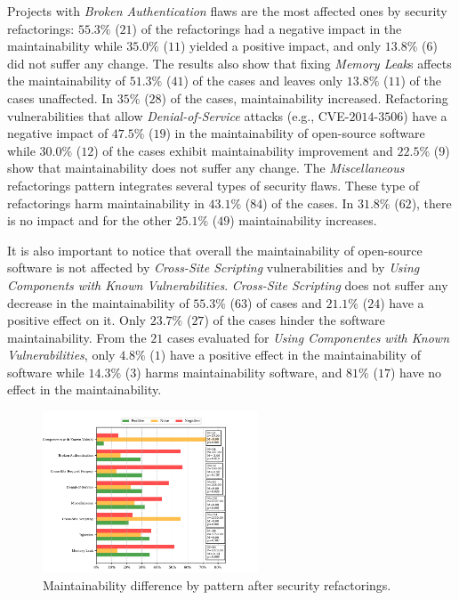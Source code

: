 \documentclass[sigconf,review]{acmart}
\begin{document}
Projects with \emph{Broken Authentication} flaws are the most affected ones by
security refactorings: $55.3\%$ ($21$) of the refactorings had a negative impact
in the maintainability while $35.0\%$ ($11$) yielded a positive impact, and only
$13.8\%$ ($6$) did not suffer any change. The results also show that fixing
\emph{Memory Leak}s affects the maintainability of $51.3\%$ ($41$) of the cases
and leaves only $13.8\%$ ($11$) of the cases unaffected. In $35\%$ ($28$) of the
cases, maintainability increased. Refactoring vulnerabilities that allow
\emph{Denial-of-Service} attacks (e.g., CVE-$2014$-$3506$) have a negative
impact of $47.5\%$ ($19$) in the maintainability of open-source software while
$30.0\%$ ($12$) of the cases exhibit maintainability improvement and $22.5\%$
($9$) show that maintainability does not suffer any change. The
\emph{Miscellaneous} refactorings pattern integrates several types of security
flaws. These type of refactorings harm maintainability in $43.1\%$ ($84$) of the
cases. In $31.8\%$ ($62$), there is no impact and for the
other $25.1\%$ ($49$) maintainability increases.

It is also important to notice that overall the maintainability of open-source
software is not affected by \emph{Cross-Site Scripting} vulnerabilities and by
\emph{Using Components with Known Vulnerabilities}. \emph{Cross-Site Scripting}
does not suffer any decrease in the maintainability of $55.3\%$ ($63$) of cases
and $21.1\%$ ($24$) have a positive effect on it. Only $23.7\%$ ($27$) of the
cases hinder the software maintainability. From the $21$ cases evaluated for
\emph{Using Componentes with Known Vulnerabilities}, only $4.8\%$ ($1$) have a
positive effect in the maintainability of software while $14.3\%$ ($3$) harms
maintainability software, and $81\%$ ($17$) have no effect in the
maintainability.


\begin{figure}[h]
	\vspace{-0.2cm}
 	\centering
 	\includegraphics[width=0.57\textwidth]{figures/category.pdf}
 	\caption{Maintainability difference by pattern after security refactorings.}
	\label{fig:pat}
	\vspace{-0.2cm}
	
\end{figure}
\end{document}
